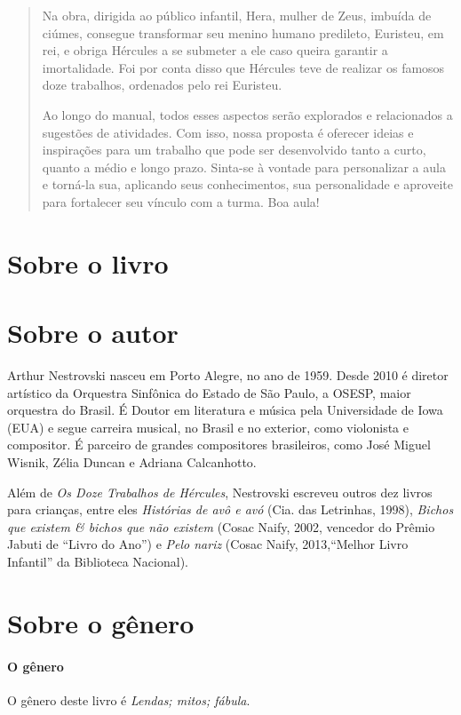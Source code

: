 \documentclass[11pt]{extarticle}
\begin{document}
\begin{abstract}
Na obra, dirigida ao público infantil, Hera, mulher de Zeus, imbuída de ciúmes, consegue transformar seu menino humano predileto, Euristeu, em rei, e obriga Hércules a se submeter a ele caso queira garantir a imortalidade. Foi por conta disso que Hércules teve de realizar os famosos doze trabalhos, ordenados pelo rei Euristeu. 

Ao longo do manual, todos esses aspectos serão explorados e relacionados a sugestões de atividades. Com isso, nossa proposta é oferecer ideias e inspirações para um trabalho que pode ser desenvolvido tanto a curto, quanto a médio e longo prazo. Sinta-se à vontade para personalizar a aula e torná-la sua, aplicando seus conhecimentos, sua personalidade e aproveite para fortalecer seu vínculo com a turma. Boa aula! 

\end{abstract}

\section{Sobre o livro}

\section{Sobre o autor}

Arthur Nestrovski nasceu em Porto Alegre, no ano de 1959. Desde 2010 é diretor artístico da Orquestra Sinfônica do Estado de São Paulo, a OSESP, maior orquestra do Brasil. É Doutor em literatura e música pela Universidade de Iowa (EUA) e segue carreira musical, no Brasil e no exterior, como violonista e compositor. É parceiro de grandes compositores brasileiros, como José Miguel Wisnik, Zélia Duncan e Adriana Calcanhotto. 

Além de \textit{Os Doze Trabalhos de Hércules}, Nestrovski escreveu outros dez livros para crianças, entre eles \textit{Histórias de avô e avó} (Cia. das Letrinhas, 1998), \textit{Bichos que existem \& bichos que não existem} (Cosac
Naify, 2002, vencedor do Prêmio Jabuti de ``Livro do Ano'')
e \textit{Pelo nariz} (Cosac Naify, 2013,“Melhor Livro Infantil'' da Biblioteca Nacional). 

\section{Sobre o gênero}

\paragraph{O gênero} O gênero deste livro é \textit{Lendas; mitos; fábula}. 
\end{document}
